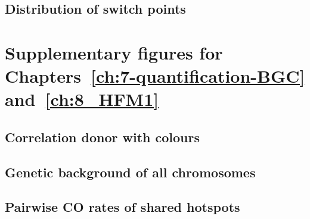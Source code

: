 \subsection{Distribution of switch points}
\section{Supplementary figures for Chapters~\ref{ch:7-quantification-BGC} and~\ref{ch:8_HFM1}}
\subsection{Correlation donor with colours}
\subsection{Genetic background of all chromosomes}
\subsection{Pairwise CO rates of shared hotspots}





